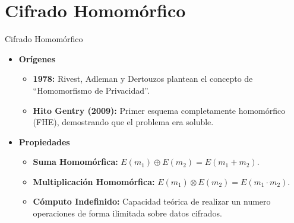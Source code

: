 \section{Cifrado Homomórfico}

\begin{frame}{Cifrado Homomórfico}
    \begin{itemize}
        \setlength{\itemsep}{10pt}
        \item \textbf{Orígenes}
        \begin{itemize}
            \item \textbf{1978:} Rivest, Adleman y Dertouzos plantean el concepto de ``Homomorfismo de Privacidad''.
            \item \textbf{Hito Gentry (2009):} Primer esquema completamente homomórfico (FHE), demostrando que el problema era soluble.
        \end{itemize}
        \item \textbf{Propiedades}
        \begin{itemize}
            \item \textbf{Suma Homomórfica:} $E(m_1) \oplus E(m_2) = E(m_1 + m_2)$.
            \item \textbf{Multiplicación Homomórfica:} $E(m_1) \otimes E(m_2) = E(m_1 \cdot m_2)$.
            \item \textbf{Cómputo Indefinido:} Capacidad teórica de realizar un numero operaciones de forma ilimitada sobre datos cifrados.
        \end{itemize}
    \end{itemize}
\end{frame}

